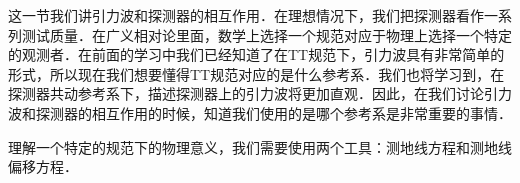 
\begin{issues}
\issueNeedCite
\issueMissDepend
\end{issues}

这一节我们讲引力波和探测器的相互作用．在理想情况下，我们把探测器看作一系列测试质量．在广义相对论里面，数学上选择一个规范对应于物理上选择一个特定的观测者．在前面的学习中我们已经知道了在TT规范下，引力波具有非常简单的形式，所以现在我们想要懂得TT规范对应的是什么参考系．我们也将学习到，在探测器共动参考系下，描述探测器上的引力波将更加直观．因此，在我们讨论引力波和探测器的相互作用的时候，知道我们使用的是哪个参考系是非常重要的事情．

理解一个特定的规范下的物理意义，我们需要使用两个工具：测地线方程和测地线偏移方程．

